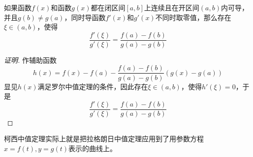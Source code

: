 \begin{theorem}
  如果函数$f(x)$和函数$g(x)$都在闭区间$[a,b]$上连续且在开区间$(a,b)$内可导，并且$g(b) \neq g(a)$，同时导函数$f'(x)$和$g'(x)$不同时取零值，那么存在$\xi \in (a,b)$，使得
  \[ \frac{f'(\xi)}{g'(\xi)} = \frac{f(a)-f(b)}{g(a)-g(b)} \]
\end{theorem}

\begin{proof}[证明]
  作辅助函数
  \[ h(x) = f(x)-f(a)-\frac{f(a)-f(b)}{g(a)-g(b)}(g(x)-g(a)) \]
  显见$h(x)$满足罗尔中值定理的条件，因此存在$\xi \in (a,b)$，使得$h'(\xi)=0$，于是
  \[ \frac{f'(\xi)}{g'(\xi)} = \frac{f(a)-f(b)}{g(a)-g(b)} \]
\end{proof}

柯西中值定理实际上就是把拉格朗日中值定理应用到了用参数方程$x=f(t),y=g(t)$表示的曲线上。

